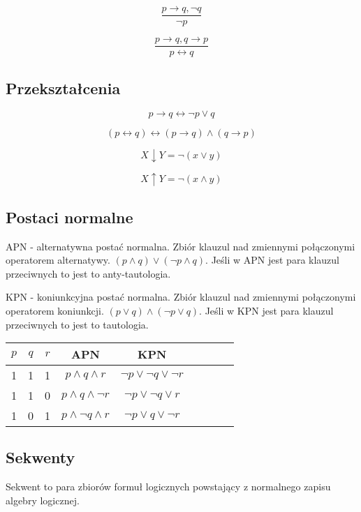 \documentclass{../notatki}
\begin{document}
$$
\frac{p \rightarrow q, \neg q}{\neg p}
$$

$$
\frac{p \rightarrow q, q \rightarrow p}{p \leftrightarrow q}
$$

\subsection{Przekształcenia}

$$
p \rightarrow q \leftrightarrow \neg p \lor q
$$

$$
(p \leftrightarrow q) \leftrightarrow (p \rightarrow q) \land (q \rightarrow p)
$$

$$
X \downarrow Y = \neg (x \lor y)
$$

$$
X \uparrow Y = \neg (x \land y)
$$

\subsection{Postaci normalne}

APN - alternatywna postać normalna. Zbiór klauzul nad zmiennymi połączonymi
operatorem alternatywy. $(p \land q) \lor (\neg p \land q)$. Jeśli w APN jest
para klauzul przeciwnych to jest to anty-tautologia.

KPN - koniunkcyjna postać normalna. Zbiór klauzul nad zmiennymi połączonymi
operatorem koniunkcji. $(p \lor q) \land (\neg p \lor q)$. Jeśli w KPN jest
para klauzul przeciwnych to jest to tautologia.

\begin{tabular}{|c|c|c|c|c|c|c|l|l|}
  \hline
  $p$ & $q$ & $r$ & APN & KPN \\ \hline
  1 & 1 & 1 & $p \land q \land r$ & $\neg p \lor \neg q \lor \neg r$ \\ \hline
  1 & 1 & 0 & $p \land q \land \neg r$ & $\neg p \lor \neg q \lor r$ \\ \hline
  1 & 0 & 1 & $p \land \neg q \land r$ & $\neg p \lor q \lor \neg r$ \\ \hline
\end{tabular}

\subsection{Sekwenty}

Sekwent to para zbiorów formuł logicznych powstający z normalnego zapisu
algebry logicznej.

\end{document}
